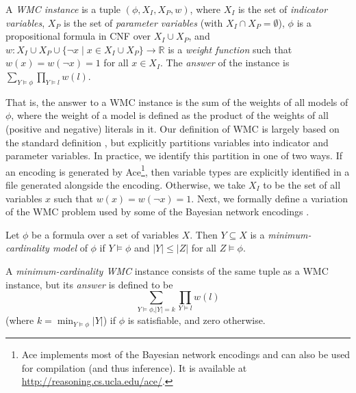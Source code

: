\begin{definition}[WMC] \label{def:wmc}
  A \emph{WMC instance} is a tuple $(\phi, X_I, X_P, w)$, where $X_I$ is
  the set of \emph{indicator variables}, $X_P$ is the set of \emph{parameter
  variables} (with $X_I \cap X_P = \emptyset$), $\phi$ is a propositional formula
  in CNF over $X_I \cup X_P$, and $w\colon X_I \cup X_P \cup \{\neg x \mid x \in
  X_I \cup X_P\} \to \mathbb{R}$ is a \emph{weight function} such that $w(x) =
  w(\neg x) = 1$ for all $x \in X_I$. The \emph{answer} of the instance is
  $\sum_{Y \models \phi} \prod_{Y \models l} w(l)$.
\end{definition}

That is, the answer to a WMC instance is the sum of the weights of all models of
$\phi$, where the weight of a model is defined as the product of the weights of
all (positive and negative) literals in it. Our definition of WMC is largely
based on the standard definition \citep{DBLP:journals/ai/ChaviraD08}, but
explicitly partitions variables into indicator and parameter variables. In
practice, we identify this partition in one of two ways. If an encoding is
generated by \textsf{Ace}\footnote{\textsf{Ace}
  \citep{DBLP:journals/ai/ChaviraD08} implements most of the Bayesian network
  encodings and can also be used for compilation (and thus inference). It is
  available at \url{http://reasoning.cs.ucla.edu/ace/}.}, then variable types
are explicitly identified in a file generated alongside the encoding. Otherwise,
we take $X_I$ to be the set of all variables $x$ such that $w(x) = w(\neg x) =
1$. Next, we formally define a variation of the WMC problem used by some of the
Bayesian network encodings
\citep{DBLP:conf/ijcai/ChaviraD05,DBLP:conf/sat/ChaviraD06}.

\begin{definition}
  Let $\phi$ be a formula over a set of variables $X$. Then $Y \subseteq X$ is a
  \emph{minimum-cardinality model} of $\phi$ if $Y \models \phi$ and $|Y| \le
  |Z|$ for all $Z \models \phi$.
\end{definition}

\begin{definition} \label{def:mcwmc}
  A \emph{minimum-cardinality WMC} instance consists of the same tuple as a WMC
  instance, but its \emph{answer} is defined to be
  \[
  \sum_{Y \models \phi\text{,}|Y| = k} \prod_{Y \models l} w(l)
  \]
  (where $k = \min_{Y \models \phi} |Y|$) if $\phi$ is satisfiable, and zero otherwise.
\end{definition}

